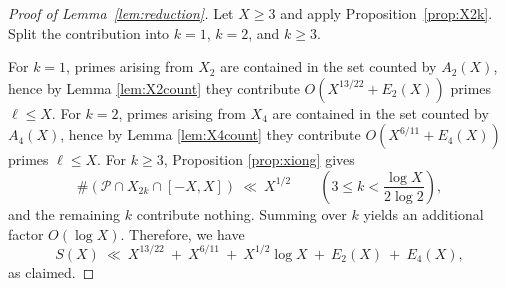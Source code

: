 \documentclass[12pt]{amsart}
\theoremstyle{remark}
\numberwithin{equation}{section}
\begin{document}
\begin{proof}[Proof of Lemma~\ref{lem:reduction}]
Let $X\ge 3$ and apply Proposition~\ref{prop:X2k}.
Split the contribution into $k=1$, $k=2$, and $k\ge 3$.

For $k=1$, primes arising from $X_2$ are contained in the set counted by $A_2(X)$, hence by Lemma
\ref{lem:X2count} they contribute $O(X^{13/22}+E_2(X))$ primes $\ell\le X$.
For $k=2$, primes arising from $X_4$ are contained in the set counted by $A_4(X)$, hence by Lemma
\ref{lem:X4count} they contribute $O(X^{6/11}+E_4(X))$ primes $\ell\le X$.
For $k\ge 3$, Proposition \ref{prop:xiong} gives
\[
\#(\mathcal P\cap X_{2k}\cap[-X,X])\ \ll\ X^{1/2}
\qquad \left(3\le k<\frac{\log X}{2\log 2}\right),
\]
and the remaining $k$ contribute nothing. Summing over $k$ yields an additional factor $O(\log X)$.
Therefore, we have
\[
S(X)\ \ll\ X^{13/22}\ +\ X^{6/11}\ +\ X^{1/2}\log X\ +\ E_2(X)\ +\ E_4(X),
\]
as claimed.
\end{proof}
\end{document}
